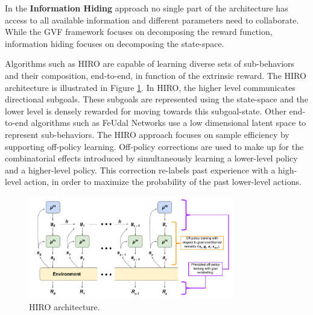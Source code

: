 In the \textbf{Information Hiding} \cite{Feudal_rl} approach no single part of the architecture has access to all available information and different parameters
need to collaborate. While the GVF framework focuses on decomposing the reward function, information hiding focuses on decomposing the state-space.


Algorithms such as HIRO \cite{HIRO} are capable of learning diverse sets of sub-behaviors and their composition, end-to-end, in function
of the extrinsic reward. The HIRO architecture is illustrated in Figure \ref{fig:HIRO}.
In HIRO, the higher level communicates directional subgoals. These subgoals are represented using the state-space and the
lower level is densely rewarded for moving towards this subgoal-state. Other end-to-end algorithms such as FeUdal Networks \cite{FuN}
use a low dimensional latent space to represent sub-behaviors.
The HIRO approach focuses on sample efficiency by supporting off-policy learning. Off-policy corrections are used to
make up for the combinatorial effects introduced by simultaneously learning a lower-level policy and a higher-level policy.
This correction re-labels past experience with a high-level action, in order to maximize the probability of the past lower-level actions.

\begin{figure}
    \centering
    \includegraphics[width=0.8\textwidth]{Images/HIRO.png}
    \caption{HIRO architecture.}
    \label{fig:HIRO}
\end{figure}

